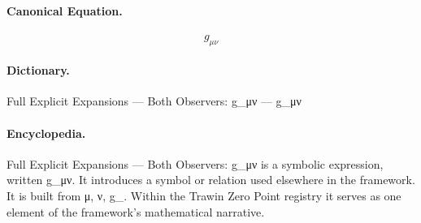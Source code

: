 \paragraph{Canonical Equation.}
\[
g_{\mu\nu}
\]

\paragraph{Dictionary.}
Full Explicit Expansions — Both Observers: g\_μν — g\_μν

\paragraph{Encyclopedia.}
Full Explicit Expansions — Both Observers: g\_μν is a symbolic expression, written g\_μν. It introduces a symbol or relation used elsewhere in the framework. It is built from μ, ν, g\_. Within the Trawin Zero Point registry it serves as one element of the framework's mathematical narrative.
